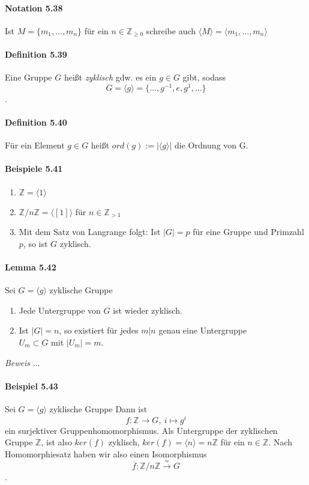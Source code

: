 \documentclass{scrartcl}
\begin{document}
\paragraph{Notation 5.38}
Ist $M = \{m_1, \dots, m_n\}$ für ein $n \in \mathbb{Z}_{\geq 0}$ schreibe auch
$\langle M \rangle = \langle m_1, \dots, m_n \rangle$

\paragraph{Definition 5.39}
Eine Gruppe $G$ heißt \textit{zyklisch} gdw. es ein $g \in G$ gibt, sodass
\[
  G = \langle {g} \rangle = \{\dots, g^{-1}, e, g^1, \dots\}
\]
.

\paragraph{Definition 5.40}
Für ein Element $g \in G$ heißt $ord(g) := |\langle {g} \rangle|$ die Ordnung
von G.

\paragraph{Beispiele 5.41}
\begin{enumerate}
\item $\mathbb{Z} = \langle {1} \rangle$
\item $\mathbb{Z}/n\mathbb{Z} = \langle {[1]} \rangle$ für $n \in \mathbb{Z}_{>
    1}$
\item Mit dem Satz von Langrange folgt: Ist $|G| = p$ für eine Gruppe und
  Primzahl $p$, so ist $G$ zyklisch.
\end{enumerate}

\paragraph{Lemma 5.42}
Sei $G = \langle {g} \rangle$ zyklische Gruppe
\begin{enumerate}
\item Jede Untergruppe von $G$ ist wieder zyklisch.
\item Ist $|G| = n$, so existiert für jedes $m|n$ genau eine Untergruppe \\ $U_m
  \subset G$ mit $|U_m| = m$.
\end{enumerate}
\textit{Beweis} $\dots$

\paragraph{Beispiel 5.43}
Sei $G = \langle {g} \rangle$ zyklische Gruppe Dann ist
\[
  f: \mathbb{Z} \to G,~i \mapsto g^i
\]
ein surjektiver Gruppenhomomorphismus. Als Untergruppe der zyklischen Gruppe
$\mathbb{Z}$, ist also $ker(f)$ zyklisch, $ker(f) = \langle {n} \rangle =
n\mathbb{Z}$ für ein $n \in \mathbb{Z}$.
Nach Homomorphiesatz haben wir also einen Isomorphismus
\[
  \overline{f}:\mathbb{Z}/n\mathbb{Z} \overset{\simeq}{\to} G
\]
.
\end{document}
